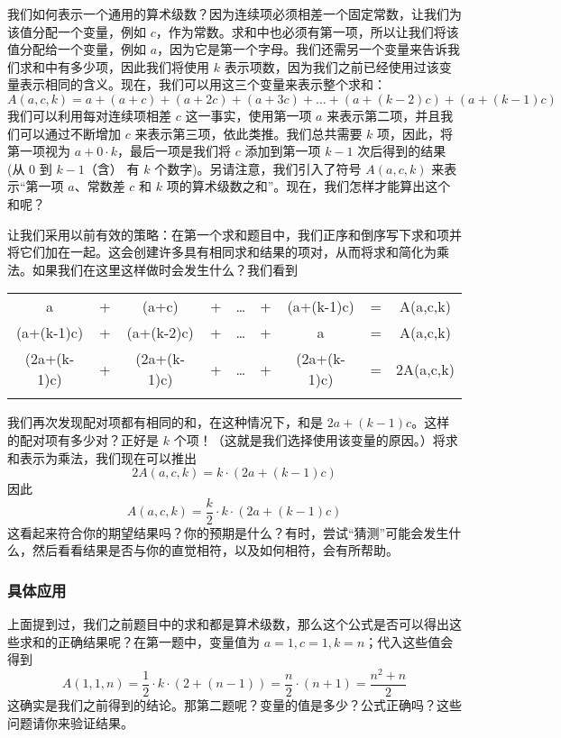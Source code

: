 我们如何表示一个通用的算术级数？因为连续项必须相差一个固定常数，让我们为该值分配一个变量，例如 $c$，作为常数。求和中也必须有第一项，所以让我们将该值分配给一个变量，例如 $a$，因为它是第一个字母。我们还需另一个变量来告诉我们求和中有多少项，因此我们将使用 $k$ 表示项数，因为我们之前已经使用过该变量表示相同的含义。现在，我们可以用这三个变量来表示整个求和：
\[A(a, c, k) = a + (a + c) + (a + 2c) + (a + 3c) + \dots + (a + (k - 2)c) + (a + (k - 1)c)\]
我们可以利用每对连续项相差 $c$ 这一事实，使用第一项 $a$ 来表示第二项，并且我们可以通过不断增加 $c$ 来表示第三项，依此类推。我们总共需要 $k$ 项，因此，将第一项视为 $a+ 0 \cdot k$，最后一项是我们将 $c$ 添加到第一项 $k - 1$ 次后得到的结果(从 $0$ 到 $k - 1$（含） 有 $k$ 个数字)。另请注意，我们引入了符号 $A(a, c, k)$ 来表示``第一项 $a$、常数差 $c$ 和 $k$ 项的算术级数之和''。现在，我们怎样才能算出这个和呢？

让我们采用以前有效的策略：在第一个求和题目中，我们正序和倒序写下求和项并将它们加在一起。这会创建许多具有相同求和结果的项对，从而将求和简化为乘法。如果我们在这里这样做时会发生什么？我们看到

\begin{center}
    \begin{tabular}{ccccccccc}
                 a & + &      (a+c) & + & \dots & + & (a+(k-1)c) & = & A(a,c,k)\\\noalign{\smallskip\smallskip}
        (a+(k-1)c) & + & (a+(k-2)c) & + & \dots & + &          a & = & A(a,c,k)\\\noalign{\smallskip\smallskip}
        \hline
        (2a+(k-1)c)& + & (2a+(k-1)c)& + & \dots & + &(2a+(k-1)c) & = &2A(a,c,k)\\\noalign{\smallskip\smallskip}
    \end{tabular}
\end{center}
我们再次发现配对项都有相同的和，在这种情况下，和是 $2a+ (k-1)c$。这样的配对项有多少对？正好是 $k$ 个项！（这就是我们选择使用该变量的原因。）将求和表示为乘法，我们现在可以推出
\[2A(a, c, k) = k \cdot (2a + (k - 1)c)\]
因此
\[A(a, c, k) = \frac{k}{2} \cdot k \cdot (2a + (k - 1)c)\]
这看起来符合你的期望结果吗？你的预期是什么？有时，尝试``猜测''可能会发生什么，然后看看结果是否与你的直觉相符，以及如何相符，会有所帮助。

\subsubsection*{具体应用}

上面提到过，我们之前题目中的求和都是算术级数，那么这个公式是否可以得出这些求和的正确结果呢？在第一题中，变量值为 $a = 1,c = 1, k = n$；代入这些值会得到
\[A(1, 1, n) = \frac{1}{2} \cdot k \cdot (2 + (n - 1)) = \frac{n}{2} \cdot(n+1) = \frac{n^2+n}{2}\]
这确实是我们之前得到的结论。那第二题呢？变量的值是多少？公式正确吗？这些问题请你来验证结果。

